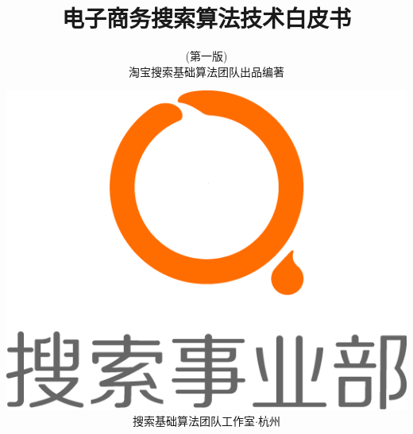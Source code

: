 
\title{\hei\vspace*{-2cm} 电子商务搜索算法技术白皮书 \\{\vspace*{-1.2cm} }}
\author{(第一版)\\淘宝搜索基础算法团队出品\hspace{1em}编著}
\date{\vspace*{3cm}\centering\includegraphics[totalheight=1.5in]{fig/searchLog.png}\\搜索基础算法团队工作室$\cdot$杭州}
\maketitle
